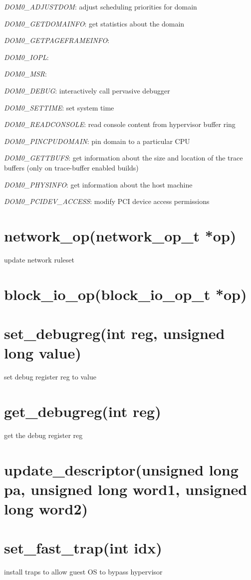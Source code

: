 \documentclass[11pt,twoside,final,openright]{xenstyle}
\begin{document}
{\it DOM0\_ADJUSTDOM}: adjust scheduling priorities for domain

{\it DOM0\_GETDOMAINFO}: get statistics about the domain

{\it DOM0\_GETPAGEFRAMEINFO}:

{\it DOM0\_IOPL}:

{\it DOM0\_MSR}:

{\it DOM0\_DEBUG}: interactively call pervasive debugger

{\it DOM0\_SETTIME}: set system time

{\it DOM0\_READCONSOLE}: read console content from hypervisor buffer ring

{\it DOM0\_PINCPUDOMAIN}: pin domain to a particular CPU

{\it DOM0\_GETTBUFS}: get information about the size and location of
                      the trace buffers (only on trace-buffer enabled builds)

{\it DOM0\_PHYSINFO}: get information about the host machine

{\it DOM0\_PCIDEV\_ACCESS}: modify PCI device access permissions


\section{network\_op(network\_op\_t *op)} 
update network ruleset

\section{ block\_io\_op(block\_io\_op\_t *op)}

\section{ set\_debugreg(int reg, unsigned long value)}
set debug register reg to value

\section{ get\_debugreg(int reg)}
 get the debug register reg

\section{ update\_descriptor(unsigned long pa, unsigned long word1, unsigned long word2)} 

\section{ set\_fast\_trap(int idx)}
 install traps to allow guest OS to bypass hypervisor
\end{document}
